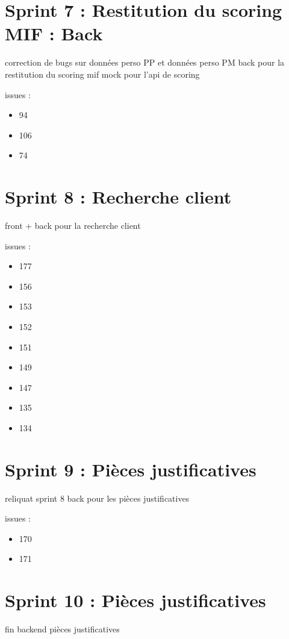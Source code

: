\section{Sprint 7 : Restitution du scoring MIF : Back}
	

	correction de bugs sur données perso PP et données perso PM	
	back pour la restitution du scoring mif
	mock pour l'api de scoring
	
issues :
\begin{itemize}
	\item 94
	\item 106
	\item 74
\end{itemize}

\section{Sprint 8 : Recherche client}
	

front + back pour la recherche client

issues :
\begin{itemize}
	\item 177
	\item 156
	\item 153
	\item 152
	\item 151
	\item 149
	\item 147
	\item 135
	\item 134
\end{itemize}

\section{Sprint 9 : Pièces justificatives}
	

reliquat sprint 8
back pour les pièces justificatives

issues :
\begin{itemize}
	\item 170
	\item 171
\end{itemize}

\section{Sprint 10 : Pièces justificatives}
	
	
fin backend pièces justificatives